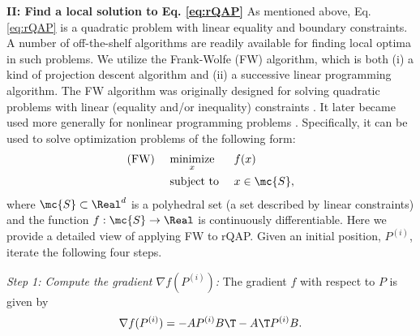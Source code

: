 \documentclass[10pt,journal,cspaper,compsoc]{IEEEtran}
\begin{document}
\textbf{II: Find a local solution to Eq. \eqref{eq:rQAP}} As mentioned above, Eq. \eqref{eq:rQAP} is a quadratic problem with linear equality and boundary constraints.  A number of off-the-shelf algorithms are readily available for finding local optima in such problems.  We utilize the Frank-Wolfe (FW) algorithm, which is both (i) a kind of projection descent algorithm
and (ii) a successive linear programming algorithm.  The FW algorithm was originally designed for solving quadratic problems with linear (equality and/or inequality) constraints \cite{Frank1956}. It later became used more generally for nonlinear programming problems  \cite{Bradley1977}.  Specifically, it can be used to solve optimization problems of the following form:
\begin{subequations} \label{eq:FW}
\begin{align}
		\text{(FW) } \quad &\underset{x}{\text{minimize}}  && f(x)  \\
		&\text{subject to } && x \in \mc{S},
\end{align}
\end{subequations}
where $\mc{S} \subset \Real^d$ is a polyhedral set (a set described by linear constraints) and the function $f: \mc{S} \to \Real$ is continuously differentiable.   
Here we provide a detailed view of applying FW to rQAP.  Given an initial position, $P^{(i)}$, iterate the following four steps.

\emph{Step 1: Compute the gradient $\nabla f(P^{(i)})$:}  The gradient $f$ with respect to $P$ is given by
\begin{align} \label{eq:grad}
	\nabla f (P^{(i)}) = 
	  - A P^{(i)} B\T - A\T P^{(i)} B.
\end{align}
\end{document}
